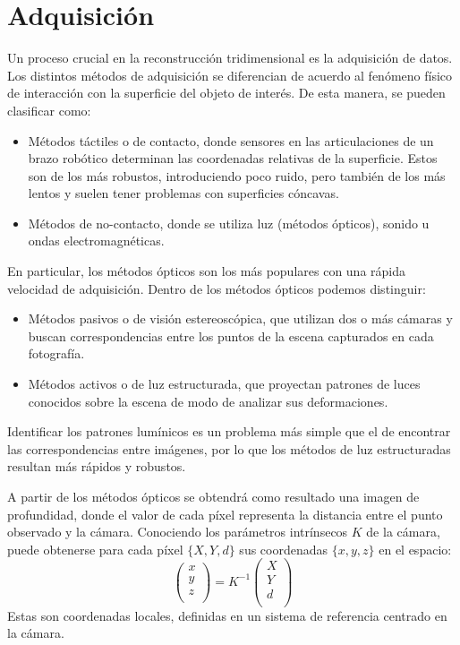 \section{Adquisición}
Un proceso crucial en la reconstrucción tridimensional es la adquisición de datos.
Los distintos métodos de adquisición se diferencian de acuerdo al fenómeno físico de interacción
con la superficie del objeto de interés. De esta manera, se pueden clasificar como:
	\begin{itemize}
		\item Métodos táctiles o de contacto, donde sensores en las articulaciones de un brazo robótico determinan las coordenadas relativas de la superficie. Estos son de los más robustos, introduciendo poco ruido, pero también de los más lentos y suelen tener problemas con superficies cóncavas.
		\item Métodos de no-contacto, donde se utiliza luz (métodos ópticos), sonido u ondas electromagnéticas.
	\end{itemize}

En particular, los métodos ópticos son los más populares con una rápida velocidad de adquisición\cite{Várady97reverseengineering}. %
Dentro de los métodos ópticos podemos distinguir:
\begin{itemize}
	\item Métodos pasivos o de visión estereoscópica,
		que utilizan dos o más cámaras y buscan correspondencias
		entre los puntos de la escena capturados en cada fotografía.
	\item Métodos activos o de luz estructurada,
		que proyectan patrones de luces conocidos sobre la escena de modo de analizar sus deformaciones.
\end{itemize}
Identificar los patrones lumínicos es un problema más simple que el de
encontrar las correspondencias entre imágenes, por lo que los métodos de luz
estructuradas resultan más rápidos y robustos\cite{Pancho}.

A partir de los métodos ópticos se obtendrá como resultado una imagen de profundidad, donde el valor de
cada píxel representa la distancia entre el punto observado y la cámara.
Conociendo los parámetros intrínsecos $K$ de la cámara,
puede obtenerse para cada píxel $\{X, Y, d\}$ sus coordenadas $\{x, y, z\}$ en el espacio:
\[
	\left(\begin{matrix}
		x \\ y \\ z \\
	\end{matrix}\right) = 
	K^{-1}
	\left(\begin{matrix}
		X \\ Y \\ d \\
	\end{matrix}\right)
\]
Estas son coordenadas locales, definidas en un sistema de referencia centrado en la cámara.


